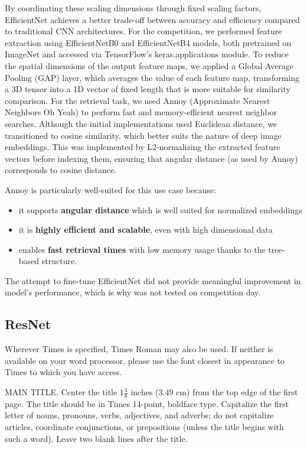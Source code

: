 By coordinating these scaling dimensions through fixed scaling factors, EfficientNet achieves a better trade-off between accuracy and efficiency compared to traditional CNN architectures.
For the competition, we performed feature extraction using EfficientNetB0 and EfficientNetB4 models, both pretrained on ImageNet and accessed via TensorFlow's keras.applications module. 
To reduce the spatial dimensions of the output feature maps, we applied a Global Average Pooling (GAP) layer, which averages the value of each feature map, transforming a 3D tensor into a 1D vector of fixed length that is more suitable for similarity comparison. 
For the retrieval task, we used Annoy (Approximate Nearest Neighbors Oh Yeah) to perform fast and memory-efficient nearest neighbor searches. Although the initial implementations used Euclidean distance, we transitioned to cosine similarity, which better suits the nature of deep image embeddings. This was implemented by L2-normalizing the extracted feature vectors before indexing them, ensuring that angular distance (as used by Annoy) corresponds to cosine distance.

Annoy is particularly well-suited for this use case because:
\begin{itemize}
\item it supports {\bf angular distance} which is well suited for normalized embeddings 
\item it is {\bf highly efficient and scalable}, even with high dimensional data 
\item enables {\bf fast retrieval times} with low memory usage thanks to the tree-based structure. 
\end{itemize}

The attempt to fine-tune EfficientNet did not provide meaningful improvement in model's performance, which is why was not tested on competition day. 

\subsection{ResNet}

Wherever Times is specified, Times Roman may also be used.
If neither is available on your word processor, please use the font closest in
appearance to Times to which you have access.

MAIN TITLE.
Center the title $1\frac{3}{8}$ inches (3.49 cm) from the top edge of the first page.
The title should be in Times 14-point, boldface type.
Capitalize the first letter of nouns, pronouns, verbs, adjectives, and adverbs;
do not capitalize articles, coordinate conjunctions, or prepositions (unless the title begins with such a word).
Leave two blank lines after the title.

